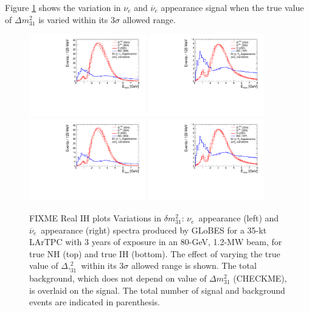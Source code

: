 \documentclass[letterpaper,11pt]{article}
\begin{document}
Figure \ref{fig:dmspec} shows the variation in $\nu_e$ and $\overline{\nu}_e$
appearance signal when the true value of $\Delta m^2_{31}$ is varied within its 3$\sigma$
allowed range. 
\begin{figure}[!htb]
  \centering
  \includegraphics[width=0.45\textwidth]{figs/spectra_35kt_nue_dmvar.pdf}
  \includegraphics[width=0.45\textwidth]{figs/spectra_35kt_nuebar_dmvar.pdf}
  \includegraphics[width=0.45\textwidth]{figs/spectra_35kt_nue_dmvar.pdf}
  \includegraphics[width=0.45\textwidth]{figs/spectra_35kt_nuebar_dmvar.pdf}
  \caption{FIXME Real IH plots
  Variations in $\delta m^2_{31}$:
  $\nu_e$~appearance (left) and $\overline{\nu}_e$~appearance (right) spectra 
  produced by GLoBES for a 35-kt LArTPC with 3 years of 
  exposure in an 80-GeV, 1.2-MW beam,  for true NH (top) and true IH (bottom). 
  The effect of varying the true
  value of $\Delta ,^2_{31}$ within its 3$\sigma$ allowed range is shown. 
  The total background, which does not depend on value of $\Delta m^2_{31}$ (CHECKME), 
  is overlaid on the signal. The total number
  of signal and background events are indicated in parenthesis.}
  \label{fig:dmspec}
\end{figure}
\end{document}

